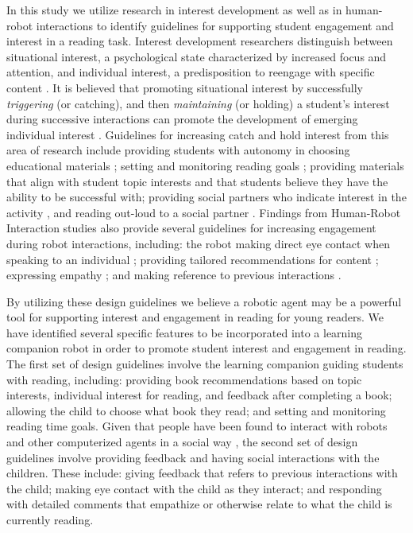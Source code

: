 \documentclass{sigchi}
\begin{document}
In this study we utilize research in interest development as well as in human-robot interactions to identify guidelines for supporting student engagement and interest in a reading task. Interest development researchers distinguish between situational interest, a psychological state characterized by increased focus and attention, and individual interest, a predisposition to reengage with specific content \cite{Hidi:2006}. It is believed that promoting situational interest by successfully \textit{triggering} (or catching), and then \textit{maintaining} (or holding) a student's interest during successive interactions can promote the development of emerging individual interest \cite{Hidi:2006, Mitchell:1993}. Guidelines for increasing catch and hold interest from this area of research include providing students with autonomy in choosing educational materials \cite{Jones:2011}; setting and monitoring reading goals \cite{Cabral:2015}; providing materials that align with student topic interests \cite{Ainley:2002} and that students believe they have the ability to be successful with; providing social partners who indicate interest in the activity \cite{Sansone:2005}, and reading out-loud to a social partner \cite{Rasinski:2003}. Findings from Human-Robot Interaction studies also provide several guidelines for increasing engagement during robot interactions, including: the robot making direct eye contact when speaking to an individual \cite{Mutlu:2011}; providing tailored recommendations for content \cite{Lim:2013}; expressing empathy \cite{Leite:2012}; and making reference to previous interactions \cite{Leite:2009}.

By utilizing these design guidelines we believe a robotic agent may be a powerful tool for supporting interest and engagement in reading for young readers. We have identified several specific features to be incorporated into a learning companion robot in order to promote student interest and engagement in reading. The first set of design guidelines involve the learning companion guiding students with reading, including: providing book recommendations based on topic interests, individual interest for reading, and feedback after completing a book; allowing the child to choose what book they read; and setting and monitoring reading time goals. Given that people have been found to interact with robots and other computerized agents in a social way \cite{Bickmore:2005}, the second set of design guidelines involve providing feedback and having social interactions with the children. These include: giving feedback that refers to previous interactions with the child; making eye contact with the child as they interact; and responding with detailed comments that empathize or otherwise relate to what the child is currently reading.
\end{document}

